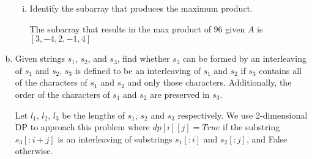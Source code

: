 \documentclass[11pt]{article}
\begin{document}
\begin{enumerate}[(a)]
\begin{enumerate}[(i)]
        \item Identify the subarray that produces the maximum product.
        \newline\begin{solution}
            The subarray that results in the max product of $96$ given $A$ is $[3, -4, 2, -1, 4]$
        \end{solution}
    \end{enumerate}
    \item Given strings $s_1$, $s_2$, and $s_3$, find whether $s_3$ can be formed by an interleaving of $s_1$ and $s_2$. $s_3$ is defined to be an interleaving of $s_1$ and $s_2$ if $s_3$ contains all of the characters of $s_1$ and $s_2$ and only those characters. Additionally, the order of the characters of $s_1$ and $s_2$ are preserved in $s_3$.
    
    Let $l_1$, $l_2$, $l_3$ be the lengths of $s_1$, $s_2$ and $s_3$ respectively. We use 2-dimensional DP to approach this problem where $dp[i][j] = True$ if the substring $s_3[: i + j]$ is an interleaving of substrings $s_1[:i]$ and $s_2[:j]$, and False otherwise.


\end{enumerate}
\end{document}
